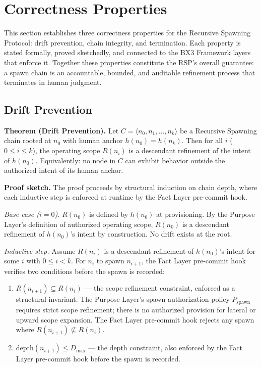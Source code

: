 \section{Correctness Properties}
\label{sec:rs-correctness}

This section establishes three correctness properties for the Recursive Spawning Protocol: drift prevention, chain integrity, and termination. Each property is stated formally, proved sketchedly, and connected to the BX3 Framework layers that enforce it. Together these properties constitute the RSP's overall guarantee: a spawn chain is an accountable, bounded, and auditable refinement process that terminates in human judgment.

\subsection{Drift Prevention}
\label{sec:rs-drift-prevention}

\medskip
\noindent\textbf{Theorem (Drift Prevention).} Let $C = \langle n_0, n_1, \ldots, n_k \rangle$ be a Recursive Spawning chain rooted at $n_0$ with human anchor $h(n_0) = h(n_k)$. Then for all $i$ ($0 \leq i \leq k$), the operating scope $R(n_i)$ is a descendant refinement of the intent of $h(n_0)$. Equivalently: no node in $C$ can exhibit behavior outside the authorized intent of its human anchor.

\medskip
\noindent\textbf{Proof sketch.} The proof proceeds by structural induction on chain depth, where each inductive step is enforced at runtime by the Fact Layer pre-commit hook.

\medskip
\textit{Base case ($i=0$).} $R(n_0)$ is defined by $h(n_0)$ at provisioning. By the Purpose Layer's definition of authorized operating scope, $R(n_0)$ is a descendant refinement of $h(n_0)$'s intent by construction. No drift exists at the root.

\medskip
\textit{Inductive step.} Assume $R(n_i)$ is a descendant refinement of $h(n_0)$'s intent for some $i$ with $0 \leq i < k$. For $n_i$ to spawn $n_{i+1}$, the Fact Layer pre-commit hook verifies two conditions before the spawn is recorded:

\begin{enumerate}
    \item[(a)] $R(n_{i+1}) \subseteq R(n_i)$ — the scope refinement constraint, enforced as a structural invariant. The Purpose Layer's spawn authorization policy $P_{\mathrm{spawn}}$ requires strict scope refinement; there is no authorized provision for lateral or upward scope expansion. The Fact Layer pre-commit hook rejects any spawn where $R(n_{i+1}) \not\subseteq R(n_i)$.
    \item[(b)] $\mathrm{depth}(n_{i+1}) \leq D_{\mathrm{max}}$ — the depth constraint, also enforced by the Fact Layer pre-commit hook before the spawn is recorded.
\end{enumerate}

